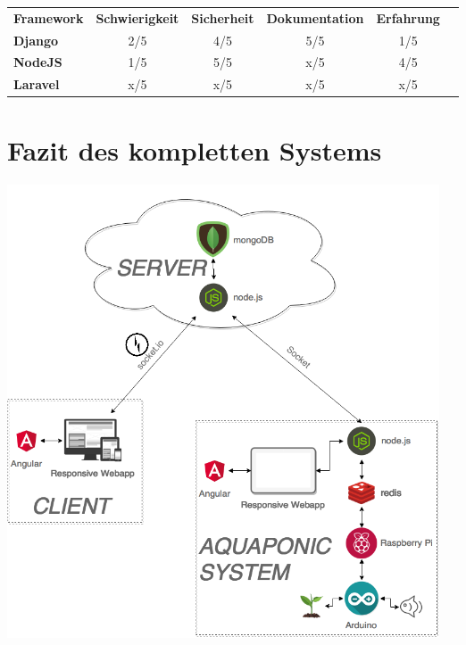 \documentclass[11pt]{article}
\begin{document}
\begin{table}[ht]
\centering
\begin{tabular}{|l|c|c|c|c|l}
\cline{1-5}
\textbf{Framework} & \multicolumn{1}{l|}{\textbf{Schwierigkeit}} & \multicolumn{1}{l|}{\textbf{Sicherheit}} & \multicolumn{1}{l|}{\textbf{Dokumentation}} & \multicolumn{1}{l|}{\textbf{Erfahrung}} & \\ \cline{1-5}
\textbf{Django}    & 2/5                                         & 4/5                                      & 5/5                                         & 1/5                                     & \\ \cline{1-5}
\textbf{NodeJS}    & 1/5                                         & 5/5                                      & x/5                                         & 4/5                                     & \\ \cline{1-5}
\textbf{Laravel}   & x/5                                         & x/5                                      & x/5                                         & x/5                                     & \\ \cline{1-5}
\end{tabular}
\end{table}

\newpage
\section{Fazit des kompletten Systems}
\includegraphics[height=5.3in]{complete_system}
\end{document}
